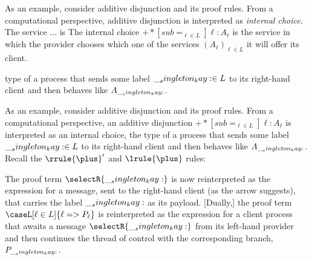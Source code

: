 

As an example, consider additive disjunction and its proof rules.
From a computational perspective, additive disjunction is interpreted as \emph{internal choice}.
The service ... is 
The internal choice $\plus*[sub=_{\ell \in L}]{\ell:A_{\ell}}$ is the service in which the provider chooses which one of the services $(A_{\ell})_{\ell \in L}$ it will offer its client.

type of a process that sends some label $\__singleton_kay: \in L$ to its right-hand client and then behaves like $A_{\__singleton_kay:}$.

As an example, consider additive disjunction and its proof rules.
From a computational perspective, an additive disjunction $\plus*[sub=_{\ell \in L}]{\ell:A_{\ell}}$ is interpreted as an internal choice, the type of a process that sends some label $\__singleton_kay: \in L$ to its right-hand client and then behaves like $A_{\__singleton_kay:}$.
Recall the $\rrule{\plus}'$ and $\lrule{\plus}$ rules:
The proof term $\selectR{\kay}$ is now reinterpreted as the expression for a message, sent to the right-hand client (as the arrow suggests), that carries the label $\__singleton_kay:$ as its payload.
[Dually,] the proof term $\caseL[\ell \in L]{\ell => P_{\ell}}$ is reinterpreted as the expression for a client process that awaits a message $\selectR{\kay}$ from its left-hand provider and then continues the thread of control with the corresponding branch, $P_{\__singleton_kay:}$.

